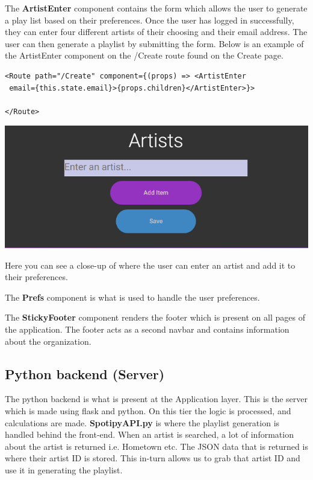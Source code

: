 The \textbf{ArtistEnter} component contains the form which allows the user to generate a play list based on their preferences. Once the user has logged in successfully, they can enter four different artists of their choosing and their email address. The user can then generate a playlist by submitting the form.\newline
Below is an example of the ArtistEnter component on the /Create route found on the Create page.\newline
\begin{verbatim} 
<Route path="/Create" component={(props) => <ArtistEnter
 email={this.state.email}>{props.children}</ArtistEnter>}>
 
</Route>
\end{verbatim}



\begin{center}    
	\includegraphics{img/AddArtist.png}
\end{center}
Here you can see a close-up of where the user can enter an artist and add it to their preferences.\newline

The \textbf{Prefs} component is what is used to handle the user preferences.\newline

The \textbf{StickyFooter} component renders the footer which is present on all pages of the application. The footer acts as a second navbar and contains information about the organization.\newline

\subsection{Python backend (Server)}
The python backend is what is present at the Application layer. This is the server which is made using flask and python. On this tier the logic is processed, and calculations are made.
\textbf{SpotipyAPI.py} is where the playlist generation is handled behind the front-end. When an artist is searched, a lot of information about the artist is returned i.e. Hometown etc.
The JSON data that is returned is where their artist ID is stored. This in-turn allows us to grab that artist ID and use it in generating the playlist.\newline

